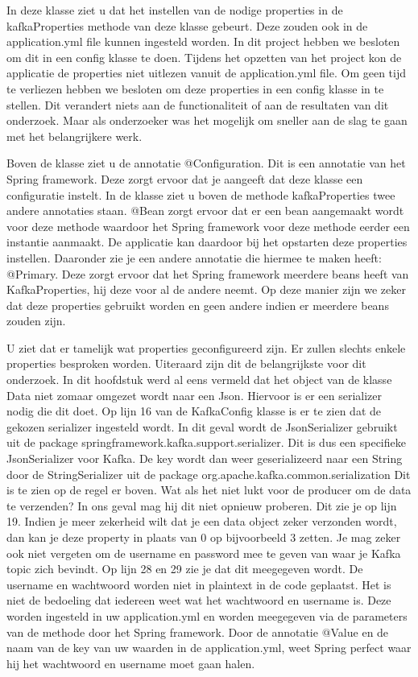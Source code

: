      In deze klasse ziet u dat het instellen van de nodige properties in de kafkaProperties methode van deze klasse gebeurt. Deze zouden ook in de application.yml file kunnen ingesteld worden. In dit project hebben we besloten om dit in een config klasse te doen. Tijdens het opzetten van het project kon de applicatie de properties niet uitlezen vanuit de application.yml file. Om geen tijd te verliezen hebben we besloten om deze properties in een config klasse in te stellen. Dit verandert niets aan de functionaliteit of aan de resultaten van dit onderzoek. Maar als onderzoeker was het mogelijk om sneller aan de slag te gaan met het belangrijkere werk.
     
     Boven de klasse ziet u de annotatie @Configuration. Dit is een annotatie van het Spring framework. Deze zorgt ervoor dat je aangeeft dat deze klasse een configuratie instelt. In de klasse ziet u boven de methode kafkaProperties twee andere annotaties staan. @Bean zorgt ervoor dat er een bean aangemaakt wordt voor deze methode waardoor het Spring framework voor deze methode eerder een instantie aanmaakt. De applicatie kan daardoor bij het opstarten deze properties instellen. Daaronder zie je een andere annotatie die hiermee te maken heeft: @Primary. Deze zorgt ervoor dat het Spring framework meerdere beans heeft van KafkaProperties, hij deze voor al de andere neemt. Op deze manier zijn we zeker dat deze properties gebruikt worden en geen andere indien er meerdere beans zouden zijn.
     
     U ziet dat er tamelijk wat properties geconfigureerd zijn. Er zullen slechts enkele properties besproken worden. Uiteraard zijn dit de belangrijkste voor dit onderzoek. In dit hoofdstuk werd al eens vermeld dat het object van de klasse Data niet zomaar omgezet wordt naar een Json. Hiervoor is er een serializer nodig die dit doet. Op lijn 16 van de KafkaConfig klasse is er te zien dat de gekozen serializer ingesteld wordt. In dit geval wordt de JsonSerializer gebruikt uit de package springframework.kafka.support.serializer. Dit is dus een specifieke JsonSerializer voor Kafka. De key wordt dan weer geserializeerd naar een String door de StringSerializer uit de package org.apache.kafka.common.serialization Dit is te zien op de regel er boven. Wat als het niet lukt voor de producer om de data te verzenden? In ons geval mag hij dit niet opnieuw proberen. Dit zie je op lijn 19. Indien je meer zekerheid wilt dat je een data object zeker verzonden wordt, dan kan je deze property in plaats van 0 op bijvoorbeeld 3 zetten. Je mag zeker ook niet vergeten om de username en password mee te geven van waar je Kafka topic zich bevindt. Op lijn 28 en 29 zie je dat dit meegegeven wordt. De username en wachtwoord worden niet in plaintext in de code geplaatst. Het is niet de bedoeling dat iedereen weet wat het wachtwoord en username is. Deze worden ingesteld in uw application.yml en worden meegegeven via de parameters van de methode door het Spring framework. Door de annotatie @Value en de naam van de key van uw waarden in de application.yml, weet Spring perfect waar hij het wachtwoord en username moet gaan halen.
     
